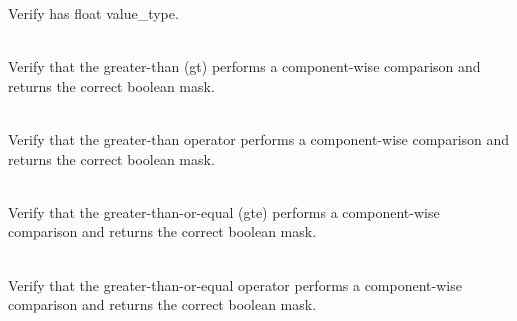 \begin{DoxyRefList}
\label{test__test000013}%
%
Verify  has float value\+\_\+type.  
\item[{\parbox[t]{\linewidth}{Member \doxylink{group___f_g_m___vec4___g_t___comp_ga0975f4c32bdc910c037444bae5372efc}{Vector4\+DComparison\+\_\+\+Greater\+Than\+\_\+\+Returns\+Boolean\+Vector\+With\+Elements\+Greater\+Than\+As\+True} ()}}]\hfill \\
\label{test__test000043}%
%
Verify that the  greater-\/than (gt) performs a component-\/wise comparison and returns the correct boolean mask.  
\item[{\parbox[t]{\linewidth}{Member \doxylink{group___f_g_m___vec4___g_t___comp_ga7a69e7e3f6188ba06e7b7038e1580c97}{Vector4\+DComparison\+\_\+\+Greater\+Than\+Operator\+\_\+\+Returns\+Boolean\+Vector\+With\+Elements\+Greater\+Than\+As\+True} ()}}]\hfill \\
\label{test__test000044}%
%
Verify that the  greater-\/than operator performs a component-\/wise comparison and returns the correct boolean mask.  
\item[{\parbox[t]{\linewidth}{Member \doxylink{group___f_g_m___vec4___g_t_e___comp_ga4a12ab678c3730040207bb93a37b9196}{Vector4\+DComparison\+\_\+\+Greater\+Than\+Or\+Equal\+\_\+\+Returns\+Boolean\+Vector\+With\+Elements\+Greater\+Than\+Or\+Equal\+As\+True} ()}}]\hfill \\
\label{test__test000049}%
%
Verify that the  greater-\/than-\/or-\/equal (gte) performs a component-\/wise comparison and returns the correct boolean mask.  
\item[{\parbox[t]{\linewidth}{Member \doxylink{group___f_g_m___vec4___g_t_e___comp_gad1d6e5e86e2a44fbb18ba12995b96cda}{Vector4\+DComparison\+\_\+\+Greater\+Than\+Or\+Equal\+Operator\+\_\+\+Returns\+Boolean\+Vector\+With\+Elements\+Greater\+Than\+Or\+Equal\+As\+True} ()}}]\hfill \\
\label{test__test000050}%
%
Verify that the  greater-\/than-\/or-\/equal operator performs a component-\/wise comparison and returns the correct boolean mask.  
\item[{\parbox[t]{\linewidth}{Member \doxylink{group___f_g_m___vec4___g_t___comp_ga30438033db6402787a233bbd206258a1}{Vector4\+DComparison\+\_\+\+Infinity\+Vector\+\_\+\+Greater\+Than\+\_\+\+Returns\+Boolean\+Vector\+With\+Correct\+Values} ()}}]\hfill \\

\end{DoxyRefList}
